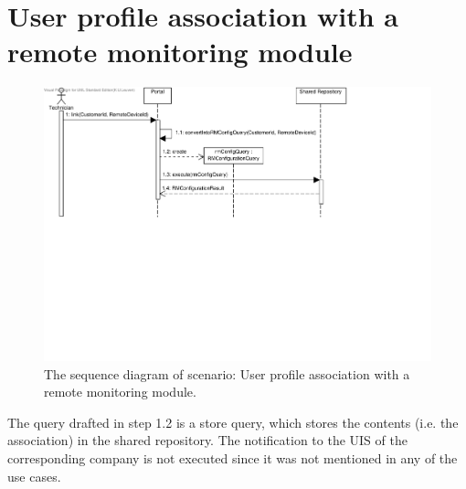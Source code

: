 \section{User profile association with a remote monitoring module}

\begin{figure}
	\begin{centering}
		\includegraphics[width=\textwidth]{figs/scenario-5-2.pdf}
		\caption{The sequence diagram of scenario: User profile association with a
		remote monitoring module.}
		\label{fig:scenario-5-2}
	\end{centering}
\end{figure}

\npar The query drafted in step 1.2 is a store query, which stores the contents
(i.e. the association) in the shared repository. The notification to the UIS of
the corresponding company is not executed since it was not mentioned in any of
the use cases.
